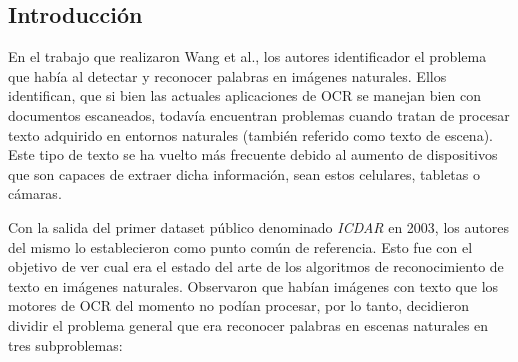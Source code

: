 \subsection{Introducción}

	En el trabajo que realizaron Wang et al., los autores identificador el problema que había al detectar y reconocer palabras en imágenes naturales. Ellos identifican, que si bien las actuales aplicaciones de OCR se manejan bien con documentos escaneados, todavía encuentran problemas cuando tratan de procesar texto adquirido en entornos naturales (también referido como texto de escena). Este tipo de texto se ha vuelto más frecuente debido al aumento de dispositivos que son capaces de extraer dicha información, sean estos celulares, tabletas o cámaras.
	
	Con la salida del primer dataset público denominado \textit{ICDAR} en 2003, los autores del mismo lo establecieron como punto común de referencia. Esto fue con el objetivo de ver cual era el estado del arte de los algoritmos de reconocimiento de texto en imágenes naturales. Observaron que habían imágenes con texto que los motores de OCR del momento no podían procesar, por lo tanto, decidieron dividir el problema general que era reconocer palabras en escenas naturales en tres subproblemas:
	

